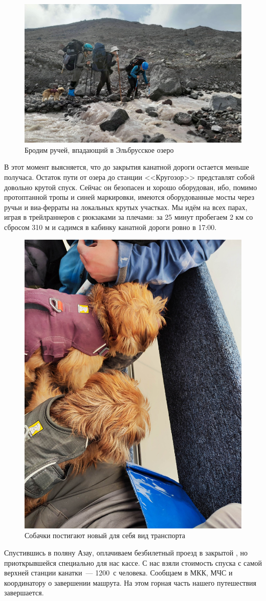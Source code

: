 \begin{figure}[h!]
	\centering
	\includegraphics[width=0.7\linewidth]{../pics/20240830_162252.jpg}
	\caption{Бродим ручей, впадающий в Эльбрусское озеро}
	\label{fig:20240830_162252.jpg}
\end{figure}

В этот момент выясняется, что до закрытия канатной дороги остается меньше получаса. Остаток пути от озера до станции <<Кругозор>> представлят собой довольно крутой спуск. Сейчас он безопасен и хорошо оборудован, ибо, помимо протоптанной тропы и синей маркировки, имеются оборудованные мосты через ручьи и виа-ферраты на локальных крутых участках. Мы идём на всех парах, играя в трейлраннеров с рюкзаками за плечами: за 25 минут пробегаем 2 км со сбросом 310 м и садимся в кабинку канатной дороги ровно в 17:00.

\begin{figure}[h!]
	\centering
	\includegraphics[width=0.4\linewidth]{../pics/IMG_20240830_170232.jpg}
	\caption{Собачки постигают новый для себя вид транспорта}
	\label{fig:IMG_20240830_170232.jpg}
\end{figure}

 Спустившись в поляну Азау, оплачиваем безбилетный проезд в закрытой , но приоткрывшейся специально для нас кассе. С нас взяли стоимость спуска с самой верхней станции канатки~--- 1200~\faRub с человека. Сообщаем в МКК, МЧС и координатору о завершении машрута. На этом горная часть нашего путешествия завершается.

